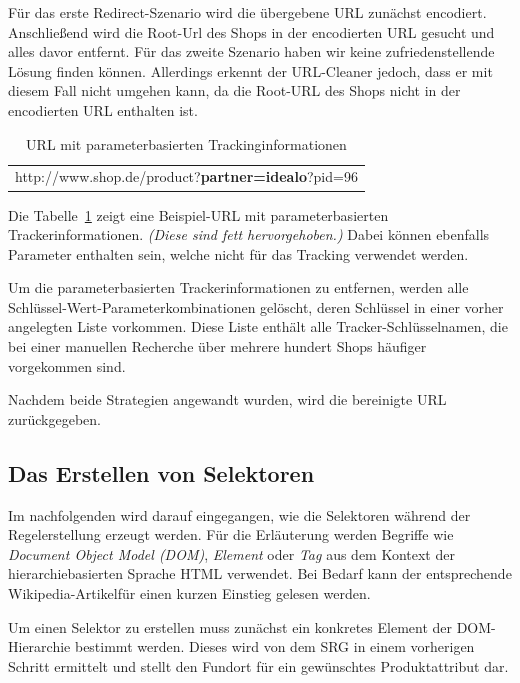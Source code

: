 Für das erste Redirect-Szenario wird die übergebene URL zunächst encodiert.
Anschließend wird die Root-Url des Shops in der encodierten URL gesucht und alles davor entfernt.
Für das zweite Szenario haben wir keine zufriedenstellende Lösung finden können.
Allerdings erkennt der URL-Cleaner jedoch, dass er mit diesem Fall nicht umgehen kann, da die Root-URL des Shops
nicht in der encodierten URL enthalten ist.

\begin{table}[h]
    \centering
    \begin{tabular}{ c }
        http://www.shop.de/product?\textbf{partner=idealo}?pid=96
    \end{tabular}
    \caption{URL mit parameterbasierten Trackinginformationen}
    \label{tab:trackparameter}
\end{table}

Die Tabelle~\ref{tab:trackparameter} zeigt eine Beispiel-URL mit parameterbasierten Trackerinformationen.
\textit{(Diese sind fett hervorgehoben.)}
Dabei können ebenfalls Parameter enthalten sein, welche nicht für das Tracking verwendet werden.

Um die parameterbasierten Trackerinformationen zu entfernen, werden alle Schlüssel-Wert-Parameterkombinationen
gelöscht, deren Schlüssel in einer vorher angelegten Liste vorkommen.
Diese Liste enthält alle Tracker-Schlüsselnamen, die bei einer manuellen Recherche über mehrere hundert Shops
häufiger vorgekommen sind.

Nachdem beide Strategien angewandt wurden, wird die bereinigte URL zurückgegeben.

\subsection{Das Erstellen von Selektoren}
\label{subsec:erstellen-von-selektoren}

Im nachfolgenden wird darauf eingegangen, wie die Selektoren während der Regelerstellung erzeugt werden.
Für die Erläuterung werden Begriffe wie \textit{Document Object Model (DOM)}, \textit{Element} oder \textit{Tag} aus
dem Kontext der hierarchiebasierten Sprache HTML verwendet.
Bei Bedarf kann der entsprechende Wikipedia-Artikel\footnotemark für einen kurzen Einstieg gelesen werden.

Um einen Selektor zu erstellen muss zunächst ein konkretes Element der DOM-Hierarchie bestimmt werden.
Dieses wird von dem SRG in einem vorherigen Schritt ermittelt und stellt den Fundort für ein gewünschtes
Produktattribut dar.

